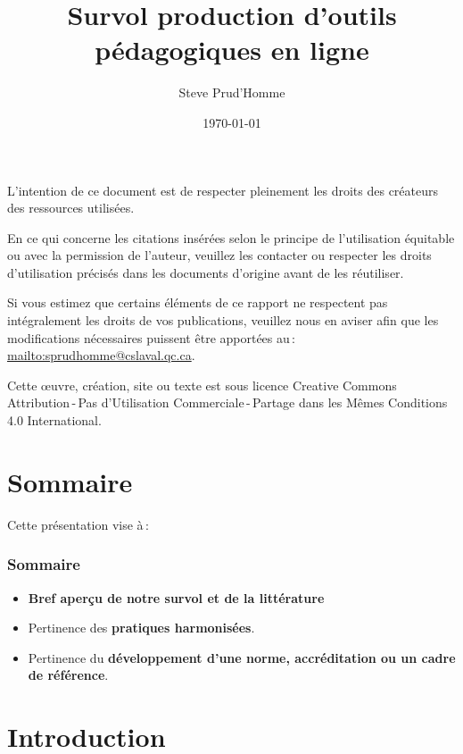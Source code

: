 	\title{Survol production d'outils pédagogiques en ligne} 
	\author{Steve Prud'Homme} 
	\date{\today} 

	
	
	\frame{\titlepage} 
	\usebackgroundtemplate{ } 
	\par L’intention de ce document est de respecter pleinement les droits des créateurs des ressources
utilisées.
	\par En ce qui concerne les citations insérées selon le principe de l'utilisation équitable ou avec la permission de l'auteur, veuillez les contacter ou respecter les droits d’utilisation précisés dans les documents d’origine avant de les réutiliser.
	\par Si vous estimez que certains éléments de ce rapport ne respectent pas intégralement les droits de vos
publications, veuillez nous en aviser afin que les modifications nécessaires puissent être apportées au\,: \url{mailto:sprudhomme@cslaval.qc.ca}.
	\par Cette \oe uvre, création, site ou texte est sous licence Creative Commons Attribution\,-\,Pas d’Utilisation Commerciale\,-\,Partage dans les Mêmes Conditions 4.0 International.
	\section{Sommaire} 
		\begin{frame}
			Cette présentation vise à\,:
			\frametitle{Sommaire}
			\begin {itemize}
				\item \textbf{Bref aperçu de notre survol et de la littérature} 
				\item Pertinence des \textbf{pratiques harmonisées}.
				\item Pertinence du \textbf{développement d'une norme, accréditation ou un cadre de référence}.

			\end{itemize}
		\end{frame}


	\section{Introduction} 
		
		
